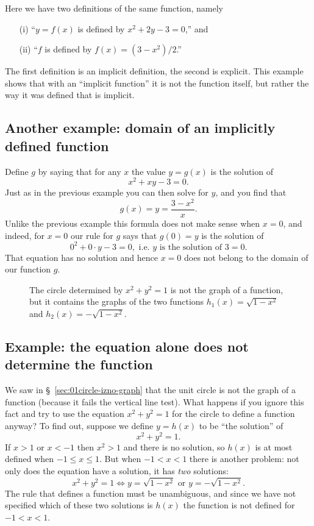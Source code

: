 Here we have two definitions of the same function, namely
\begin{itemize}
\item [(i)] ``$y=f(x)$ is defined by $x^2+2y-3=0$,'' and
\item [(ii)] ``$f$ is defined by $f(x) = (3-x^2)/2$.''
\end{itemize}
The first definition is an implicit definition, the second is explicit.
This example shows that with an ``implicit function'' it is not the
function itself, but rather the way it was defined that is implicit.

\subsection{Another example: domain of an implicitly defined function} 
Define $g$ by saying that for any $x$ the value $y=g(x)$ is the
solution of
\[
  x^2+xy-3=0.
\]
Just as in the previous example you can then solve for $y$, and you
find that
\[
  g(x) = y = \frac{3-x^2}x.
\]
Unlike the previous example this formula does not make sense when $x=0$, and
indeed, for $x=0$ our rule for $g$ says that $g(0) = y$ is the solution of
\[
  0^2+0\cdot y-3=0, \text{ i.e. $y$ is the solution of }3=0.
\]
That equation has no solution and hence $x=0$ does not belong to the domain
of our function $g$.  

\begin{figure}[h]
  \centering
  
  \caption{The circle determined by $x^2+y^2=1$ is not the graph of a
  function, but it contains the graphs of the two functions
  $h_1(x) = \sqrt{1-x^2}$ and $h_2(x)= -\sqrt{1-x^2}$.}
  \label{fig:01circle}
\end{figure}


\subsection{Example: the equation alone does not determine the function} 
\label{sec:implicit-example-h1h2h3}
We saw in \S~\ref{sec:01circle-izno-graph} that the unit circle is not
the graph of a function (because it fails the vertical line test).
What happens if you ignore this fact and try to use the equation
$x^2+y^2=1$ for the circle to define a function anyway?
To find out, suppose we define $y=h(x)$ to be ``the solution'' of
\[
  x^2 + y^2=1.
\]
If $x>1$ or $x<-1$ then $x^2>1$ and there is no solution, so $h(x)$ is
at most defined when $-1\leq x\leq 1$.  But when $-1<x<1$ there is
another problem: not only does the equation have a solution, it
has \emph{two} solutions:
\[
  x^2+y^2=1 \iff y = \sqrt{1-x^2} \text{ or } y=-\sqrt{1-x^2}.
\]
The rule that defines a function must be unambiguous, and since we
have not specified which of these two solutions is $h(x)$ the function
is not defined for $-1<x<1$.



